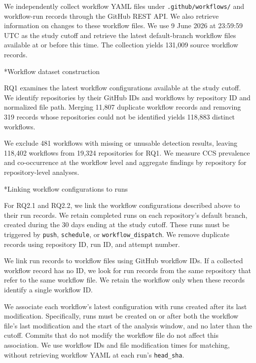 \documentclass[smallextended]{svjour3}
\makeatletter
\newcommand{\datastepheading}{%
  \@startsection{paragraph}{4}{\z@}{-8pt}{3pt}%
    {\normalfont\normalsize\bfseries}*}
\makeatother
\begin{document}
We independently collect workflow YAML files under \texttt{.github/workflows/} and workflow-run records through the GitHub REST API. We also retrieve information on changes to these workflow files. We use 9 June 2026 at 23:59:59 UTC as the study cutoff and retrieve the latest default-branch workflow files available at or before this time. The collection yields 131,009 source workflow records.

\datastepheading{Workflow dataset construction}

RQ1 examines the latest workflow configurations available at the study cutoff. We identify repositories by their GitHub IDs and workflows by repository ID and normalized file path. Merging 11,807 duplicate workflow records and removing 319 records whose repositories could not be identified yields 118,883 distinct workflows.

We exclude 481 workflows with missing or unusable detection results, leaving 118,402 workflows from 19,324 repositories for RQ1. We measure CCS prevalence and co-occurrence at the workflow level and aggregate findings by repository for repository-level analyses.

\datastepheading{Linking workflow configurations to runs}

For RQ2.1 and RQ2.2, we link the workflow configurations described above to their run records. We retain completed runs on each repository's default branch, created during the 30 days ending at the study cutoff. These runs must be triggered by \texttt{push}, \texttt{schedule}, or \texttt{workflow\_dispatch}. We remove duplicate records using repository ID, run ID, and attempt number.

We link run records to workflow files using GitHub workflow IDs. If a collected workflow record has no ID, we look for run records from the same repository that refer to the same workflow file. We retain the workflow only when these records identify a single workflow ID.

We associate each workflow's latest configuration with runs created after its last modification. Specifically, runs must be created on or after both the workflow file's last modification and the start of the analysis window, and no later than the cutoff. Commits that do not modify the workflow file do not affect this association. We use workflow IDs and file modification times for matching, without retrieving workflow YAML at each run's \texttt{head\_sha}.
\end{document}
